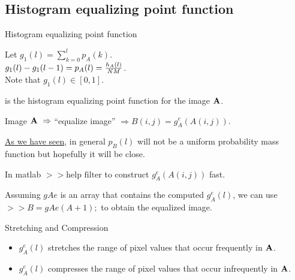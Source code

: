 \subsection{Histogram equalizing point function}
%
%
\begin{slide}{Histogram equalizing point function}
\begin{titlelist}{}{}
\small
\item<2-> Let $g_1(l)=\sum_{k=0}^{l} p_A(k)$.\\
$
g_1(l)-g_1(l-1)=p_A(l)= {h_A(l)\over NM}
$.\\


Note that $g_1(l)\in [0,1]$.

\item<3-> 
is the histogram equalizing point function for the image ${\bf A}$.

\item<4-> 
Image ${\bf A}\ \Rightarrow$ ``equalize image'' $\Rightarrow
B(i,j)=g_A^e(A(i,j))$.


\item<5-> 
\hyperlink{darv}{As we have seen}, in general $p_B(l)$
will not be a uniform probability mass function but hopefully
it will be close. 

\item<6-> 
In matlab $>> \mbox{help filter}$ to construct
$g_A^e(A(i,j))$ fast.

\item<7-> 
Assuming $gAe$ is an array that contains the computed
$g_A^e(l)$, we can use $>> B=gAe(A+1);$ to obtain the equalized image.

\end{titlelist}

\end{slide}



%
%
\begin{slide}{Stretching and Compression}
\vspace*{-3ex}
\begin{itemize}
\small
\item $g_A^e(l)$ stretches the range of pixel values that occur
frequently in ${\bf A}$.
\item $g_A^e(l)$ compresses the range of pixel values that occur
infrequently in ${\bf A}$.
\end{itemize}

\end{slide}



